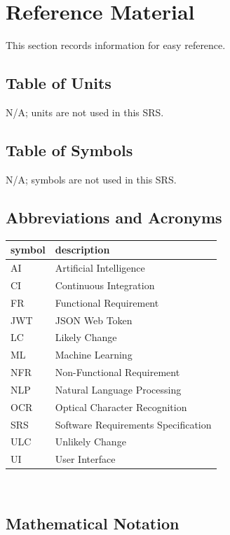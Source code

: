 \documentclass[12pt]{article}
\begin{document}
~\\


~\newpage

\section{Reference Material}

This section records information for easy reference.

\subsection{Table of Units}

N/A; units are not used in this SRS.

\subsection{Table of Symbols}

N/A; symbols are not used in this SRS.

\subsection{Abbreviations and Acronyms}

\renewcommand{\arraystretch}{1.2}
\begin{tabular}{l l} 
  \toprule		
  \textbf{symbol} & \textbf{description}\\
  \midrule 
  AI & Artificial Intelligence\\
  CI & Continuous Integration\\
  FR & Functional Requirement\\
  JWT & JSON Web Token\\
  LC & Likely Change\\
  ML & Machine Learning\\
  NFR & Non-Functional Requirement\\
  NLP & Natural Language Processing\\
  OCR & Optical Character Recognition\\
  SRS & Software Requirements Specification\\
  ULC & Unlikely Change\\
  UI & User Interface\\
  \bottomrule
\end{tabular}\\

\subsection{Mathematical Notation}
\end{document}
